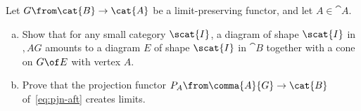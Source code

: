 \begin{aquestion}       
\label{ex:gaft-creates}
Let $G \from \cat{B} \to \cat{A}$ be a limit-preserving functor, and let $A
\in \cat{A}$.
% 
\begin{enumerate}[(b)]
\item 
Show that for any small category $\scat{I}$, a diagram of shape $\scat{I}$
in $\comma{A}{G}$ amounts to a diagram $E$ of shape $\scat{I}$ in $\cat{B}$
together with a cone on $G \of E$ with vertex $A$.

\item
\label{part:gaft-creates-creates}
Prove that the projection functor $P_A \from \comma{A}{G} \to \cat{B}$
of~\eqref{eq:pjn-aft} creates limits.%
%
%
%
\end{enumerate}
\end{aquestion}
